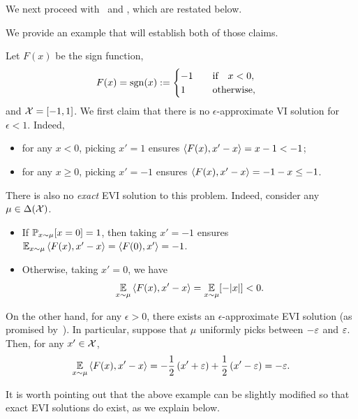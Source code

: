 We next proceed with~ and , which are restated below.

\VIsvsEVIs*

\notexact*

We provide an example that will establish both of those claims.

\begin{example}
    \label{ex:sign-evi}
    Let $F(x)$ be the sign function, 
    $$F(x) = \sgn(x) := 
    \begin{cases} 
        -1 &\qif x < 0, \\ 
        1 &\qq{otherwise,} 
    \end{cases}$$ 
    and ${\mathcal{X}}=[-1,1]$. We first claim that there is no $\epsilon$-approximate VI solution for $\epsilon <1$. Indeed, 
    \begin{itemize}%
        \item for any $x<0$, picking $x'=1$ ensures $\ip{F(x), x' - x}=x-1<-1$;
        \item for any  $x \geq 0$, picking $x'=-1$ ensures $\ip{F(x), x' - x}=-1-x \leq -1$.
    \end{itemize}
    There is also no \emph{exact} EVI solution to this problem. Indeed, consider any $\mu \in \Delta({\mathcal{X}})$. 
    \begin{itemize}%
        \item If $\mathbb{P}_{x \sim \mu}[x = 0]= 1$, then taking $x'=-1$ ensures $\E_{x\sim\mu} \ip{F(x), x' - x} = \langle F(0), x' \rangle = -1$.
        \item Otherwise, taking $x'=0$, we have
    \begin{align*}
         \E_{x\sim\mu} \ip{F(x), x' - x}  =  \E_{x\sim\mu} [-|x|] < 0.
    \end{align*}
    \end{itemize}
    On the other hand, for any $\epsilon>0$, there exists an $\epsilon$-approximate EVI solution (as promised by~). In particular, suppose that $\mu$ uniformly picks between $-\varepsilon$ and $\varepsilon$. Then, for any $x' \in {\mathcal{X}}$,
    \begin{align*}
         \E_{x\sim\mu} \ip{F(x), x' - x}  = - \frac{1}{2} \left(x' + \epsilon \right) + \frac{1}{2} \left(x' -\epsilon \right)= -\epsilon.
    \end{align*}
\end{example}

It is worth pointing out that the above example can be slightly modified so that exact EVI solutions do exist, as we explain below.

